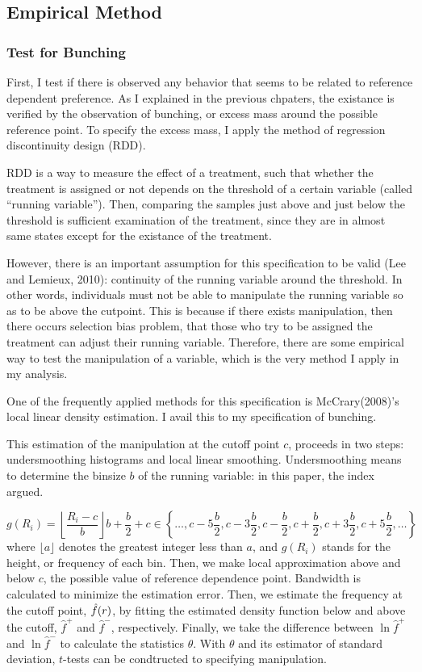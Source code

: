 \documentclass[dvipdfmx, 12pt]{article}
\begin{document}
 \subsection{Empirical Method}

  \subsubsection{Test for Bunching}

  First, I test if there is observed any behavior that seems to be related to reference dependent preference. As I explained in the previous chpaters, the existance is verified by the observation of bunching, or excess mass around the possible reference point. To specify the excess mass, I apply the method of regression discontinuity design (RDD).

  RDD is a way to measure the effect of a treatment, such that whether the treatment is assigned or not depends on the threshold of a certain variable (called ``running variable''). Then, comparing the samples just above and just below the threshold is sufficient examination of the treatment, since they are in almost same states except for the existance of the treatment.

  However, there is an important assumption for this specification to be valid (Lee and Lemieux, 2010): continuity of the running variable around the threshold. In other words, individuals must not be able to manipulate the running variable so as to be above the cutpoint. This is because if there exists manipulation, then there occurs selection bias problem, that those who try to be assigned the treatment can adjust their running variable. Therefore, there are some empirical way to test the manipulation of a variable, which is the very method I apply in my analysis.

  One of the frequently applied methods for this specification is  McCrary(2008)'s local linear density estimation. I avail this to my specification of bunching.

  This estimation of the manipulation at the cutoff point $c$, proceeds in two steps: undersmoothing histograms and local linear smoothing. Undersmoothing means to determine the binsize $b$ of the running variable: in this paper, the index argued.

  \[
  g(R_i) = \left \lfloor \dfrac{R_i - c}{b} \right \rfloor b
  + \dfrac{b}{2} + c \in \left \{ \ldots, c-5\dfrac{b}{2},  c-3\dfrac{b}{2}, c-\dfrac{b}{2}, c+\dfrac{b}{2}, c+3\dfrac{b}{2}, c+5\dfrac{b}{2}, \ldots \right \}
  \]
  where $\lfloor a \rfloor$ denotes the greatest integer less than $a$, and $g(R_i)$ stands for the height, or frequency of each bin. Then, we make local approximation above and below $c$, the possible value of reference dependence point. Bandwidth is calculated to minimize the estimation error. Then, we estimate the frequency at the cutoff point, $\Hat{f}(r)$, by fitting the estimated density function below and above the cutoff, $\hat{f}^+$ and $\hat{f}^-$, respectively. Finally, we take the difference between $\ln \hat{f}^+$ and $\ln \hat{f}^-$ to calculate the statistics $\theta$. With $\theta$ and its estimator of standard deviation, $t$-tests can be condtructed to specifying manipulation.
\end{document}
